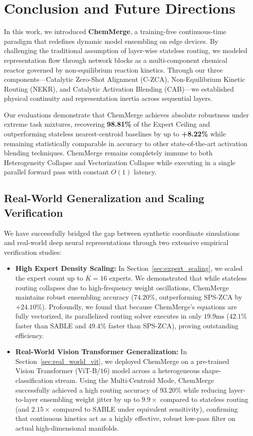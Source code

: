 \section{Conclusion and Future Directions}
\label{sec:conclusion}

In this work, we introduced \textbf{ChemMerge}, a training-free continuous-time paradigm that redefines dynamic model ensembling on edge devices. By challenging the traditional assumption of layer-wise stateless routing, we modeled representation flow through network blocks as a multi-component chemical reactor governed by non-equilibrium reaction kinetics. Through our three components---Catalytic Zero-Shot Alignment (C-ZCA), Non-Equilibrium Kinetic Routing (NEKR), and Catalytic Activation Blending (CAB)---we established physical continuity and representation inertia across sequential layers. 

Our evaluations demonstrate that ChemMerge achieves absolute robustness under extreme task mixtures, recovering \textbf{98.81\%} of the Expert Ceiling and outperforming stateless nearest-centroid baselines by up to \textbf{+8.22\%} while remaining statistically comparable in accuracy to other state-of-the-art activation blending techniques. ChemMerge remains completely immune to both Heterogeneity Collapse and Vectorization Collapse while executing in a single parallel forward pass with constant $O(1)$ latency.

\subsection{Real-World Generalization and Scaling Verification}
We have successfully bridged the gap between synthetic coordinate simulations and real-world deep neural representations through two extensive empirical verification studies:
\begin{itemize}
    \item \textbf{High Expert Density Scaling:} In Section~\ref{sec:expert_scaling}, we scaled the expert count up to $K=16$ experts. We demonstrated that while stateless routing collapses due to high-frequency weight oscillations, ChemMerge maintains robust ensembling accuracy ($74.20\%$, outperforming SPS-ZCA by $+24.10\%$). Profoundly, we found that because ChemMerge's equations are fully vectorized, its parallelized routing solver executes in only $19.9\text{ms}$ ($42.1\%$ faster than SABLE and $49.4\%$ faster than SPS-ZCA), proving outstanding efficiency.
    \item \textbf{Real-World Vision Transformer Generalization:} In Section~\ref{sec:real_world_vit}, we deployed ChemMerge on a pre-trained Vision Transformer ($\text{ViT-B/16}$) model across a heterogeneous shape-classification stream. Using the Multi-Centroid Mode, ChemMerge successfully achieved a high routing accuracy of $93.20\%$ while reducing layer-to-layer ensembling weight jitter by up to $9.9\times$ compared to stateless routing (and $2.15\times$ compared to SABLE under equivalent sensitivity), confirming that continuous kinetics act as a highly effective, robust low-pass filter on actual high-dimensional manifolds.
\end{itemize}

